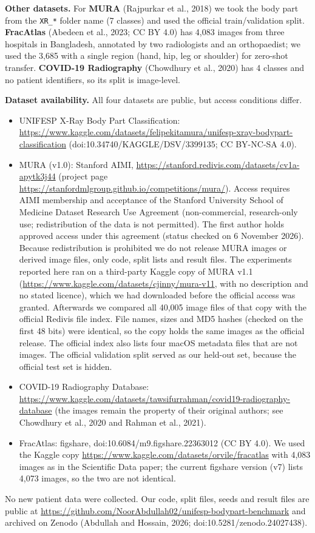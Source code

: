 \textbf{Other datasets.} For \textbf{MURA} (Rajpurkar et al., 2018) we took the body part from the \texttt{XR\_*} folder name (7 classes) and used the official train/validation split. \textbf{FracAtlas} (Abedeen et al., 2023; CC BY 4.0) has 4,083 images from three hospitals in Bangladesh, annotated by two radiologists and an orthopaedist; we used the 3,685 with a single region (hand, hip, leg or shoulder) for zero-shot transfer. \textbf{COVID-19 Radiography} (Chowdhury et al., 2020) has 4 classes and no patient identifiers, so its split is image-level.


\textbf{Dataset availability.} All four datasets are public, but access conditions differ.

\begin{itemize}\item UNIFESP X-Ray Body Part Classification: \url{https://www.kaggle.com/datasets/felipekitamura/unifesp-xray-bodypart-classification} (doi:10.34740/KAGGLE/DSV/3399135; CC BY-NC-SA 4.0).\item MURA (v1.0): Stanford AIMI, \url{https://stanford.redivis.com/datasets/cv1a-apytk3j44} (project page \url{https://stanfordmlgroup.github.io/competitions/mura/}). Access requires AIMI membership and acceptance of the Stanford University School of Medicine Dataset Research Use Agreement (non-commercial, research-only use; redistribution of the data is not permitted). The first author holds approved access under this agreement (status checked on 6 November 2026). Because redistribution is prohibited we do not release MURA images or derived image files, only code, split lists and result files. The experiments reported here ran on a third-party Kaggle copy of MURA v1.1 (\url{https://www.kaggle.com/datasets/cjinny/mura-v11}, with no description and no stated licence), which we had downloaded before the official access was granted. Afterwards we compared all 40,005 image files of that copy with the official Redivis file index. File names, sizes and MD5 hashes (checked on the first 48 bits) were identical, so the copy holds the same images as the official release. The official index also lists four macOS metadata files that are not images. The official validation split served as our held-out set, because the official test set is hidden.\item COVID-19 Radiography Database: \url{https://www.kaggle.com/datasets/tawsifurrahman/covid19-radiography-database} (the images remain the property of their original authors; see Chowdhury et al., 2020 and Rahman et al., 2021).\item FracAtlas: figshare, doi:10.6084/m9.figshare.22363012 (CC BY 4.0). We used the Kaggle copy \url{https://www.kaggle.com/datasets/orvile/fracatlas} with 4,083 images as in the Scientific Data paper; the current figshare version (v7) lists 4,073 images, so the two are not identical.\end{itemize}
No new patient data were collected. Our code, split files, seeds and result files are public at \url{https://github.com/NoorAbdullah02/unifesp-bodypart-benchmark} and archived on Zenodo (Abdullah and Hossain, 2026; doi:10.5281/zenodo.24027438).


